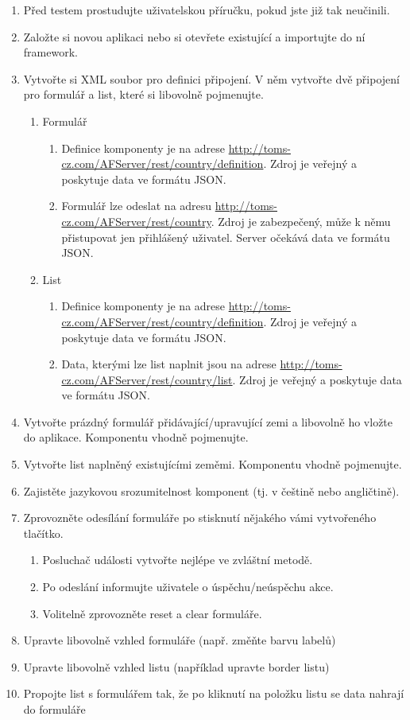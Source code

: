 \begin{enumerate}
\item Před testem prostudujte uživatelskou příručku, pokud jste již tak neučinili.
\item Založte si novou aplikaci nebo si otevřete existující a importujte do ní framework.
\item Vytvořte si XML soubor pro definici připojení. V něm vytvořte dvě připojení pro formulář a list, které si libovolně pojmenujte. 
\begin{enumerate}
\item Formulář
\begin{enumerate}
\item Definice komponenty je na adrese \url{http://toms-cz.com/AFServer/rest/country/definition}. Zdroj je veřejný a poskytuje data ve formátu JSON.
\item Formulář lze odeslat na adresu \url{http://toms-cz.com/AFServer/rest/country}. Zdroj je zabezpečený, může k němu přistupovat jen přihlášený uživatel. Server očekává data ve formátu JSON.
\end{enumerate}
\item List
\begin{enumerate}
\item Definice komponenty je na adrese \url{http://toms-cz.com/AFServer/rest/country/definition}. Zdroj je veřejný a poskytuje data ve formátu JSON.
\item Data, kterými lze list naplnit jsou na adrese \url{http://toms-cz.com/AFServer/rest/country/list}.  Zdroj je veřejný a poskytuje data ve formátu JSON.
\end{enumerate}
\end{enumerate}
\item Vytvořte prázdný formulář přidávající/upravující zemi a libovolně ho vložte do aplikace. Komponentu vhodně pojmenujte.
\item Vytvořte list naplněný existujícími zeměmi. Komponentu vhodně pojmenujte.
\item Zajistěte jazykovou srozumitelnost komponent (tj. v češtině nebo angličtině).
\item Zprovozněte odesílání formuláře po stisknutí nějakého vámi vytvořeného tlačítko.
\begin{enumerate}
\item Posluchač události vytvořte nejlépe ve zvláštní metodě.
\item Po odeslání informujte uživatele o úspěchu/neúspěchu akce.
\item Volitelně zprovozněte reset a clear formuláře.
\end{enumerate}
\item Upravte libovolně vzhled formuláře (např. změňte barvu labelů)
\item Upravte libovolně vzhled listu (například upravte border listu)
\item Propojte list s formulářem tak, že po kliknutí na položku listu se data nahrají do formuláře
\end{enumerate}
